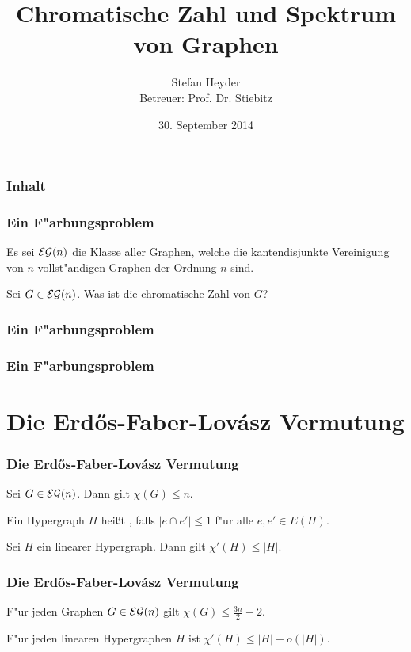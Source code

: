 \documentclass{beamer}
\title[Chrom. Zahl und Spektrum von Graphen]{Chromatische Zahl und Spektrum von Graphen}
\author[Stefan Heyder]{Stefan Heyder \\ Betreuer: Prof. Dr. Stiebitz}
\institute{TU Ilmenau}
\date{30. September 2014}
\begin{document}
\begin{frame}[<+->]
  \titlepage
\end{frame}

\begin{frame}[<+->]
  \frametitle{Inhalt} 
  \tableofcontents 
\end{frame}

\begin{frame}[<+->]
  \frametitle{Ein F"arbungsproblem}
   Es sei ${\cal EG}(n)$ die Klasse aller Graphen, welche die kantendisjunkte Vereinigung von $n$ vollst"andigen Graphen der Ordnung $n$ sind.

   \begin{problem}
     Sei $G\in {\cal EG}(n)$. Was ist die chromatische Zahl von $G$?
   \end{problem}
\end{frame}
 \begin{frame}
   \frametitle{Ein F"arbungsproblem}
  
 \end{frame}
 \begin{frame}
   \frametitle{Ein F"arbungsproblem}
  
 \end{frame}

\section{Die Erd\H os-Faber-Lov\'asz Vermutung}

\begin{frame}[<+->]
  \frametitle{Die Erd\H{o}s-Faber-Lov\'asz Vermutung}
  \begin{conjecture}
    Sei $G\in{\cal EG}(n)$. Dann gilt $\chi(G) \leq n$.
  \end{conjecture}
  \pause
  Ein Hypergraph $H$ hei{\ss}t , falls $|e\cap e'| \leq 1$ f"ur alle $e,e'\in E(H)$.
  \pause
  \begin{conjecture}
    Sei $H$ ein linearer Hypergraph. Dann gilt $\chi'(H) \leq |H|$.
  \end{conjecture}
\end{frame}

\begin{frame}[<+->]
  \frametitle{Die Erd\H{o}s-Faber-Lov\'asz Vermutung}
  \begin{theorem}
    F"ur jeden Graphen $G\in {\cal EG}(n)$ gilt $\chi(G) \leq \frac{3n}{2} -2$.
  \end{theorem}
  \begin{theorem}[Kahn]
    F"ur jeden linearen Hypergraphen $H$ ist $\chi'(H) \leq |H| + o(|H|)$.
  \end{theorem}
\end{frame}
\end{document}
